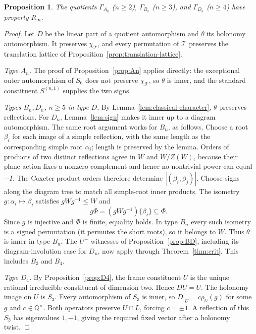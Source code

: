 \documentclass[11pt]{amsart}
\newtheorem{proposition}[theorem]{Proposition}
\theoremstyle{definition}
\newcommand{\Q}{\mathbb{Q}}
\newcommand{\T}{\mathcal{T}}
\newcommand{\Rinf}{R_\infty}
\begin{document}
\begin{proposition}\label{prop:classical-quotients}
The quotients $\Gamma_{A_n}$ ($n\ge2$), $\Gamma_{B_n}$ ($n\ge3$), and $\Gamma_{D_n}$ ($n\ge4$)
have property $\Rinf$.
\end{proposition}
\begin{proof}
Let $D$ be the linear part of a quotient automorphism and $\theta$ its holonomy automorphism.
It preserves $\chi_\T$, and every permutation of $\T$ preserves the translation lattice of Proposition~\ref{prop:translation-lattice}.

\emph{Type $A_n$.} The proof of Proposition~\ref{prop:An} applies directly: the exceptional outer
automorphism of $S_6$ does not preserve $\chi_\T$, so $\theta$ is inner, and the standard constituent
$S^{(n,1)}$ supplies the two signs.

\emph{Types $B_n,D_n$, $n\ge5$ in type $D$.} By Lemma~\ref{lem:classical-character}, $\theta$ preserves
reflections. For $D_n$, Lemma~\ref{lem:sign} makes it inner up to a diagram automorphism.
The same root argument works for $B_n$, as follows. Choose a root $\beta_i$ for each image of a simple
reflection, with the same length as the corresponding simple root $\alpha_i$; length is preserved by the lemma.
Orders of products of two distinct reflections agree in $W$ and $W/Z(W)$, because their plane action
fixes a nonzero complement and hence no nontrivial power can equal $-I$.
The Coxeter product orders therefore determine $|(\beta_i,\beta_j)|$.
Choose signs along the diagram tree to match all simple-root inner products. The isometry $g\colon\alpha_i\mapsto\beta_i$ satisfies $gWg^{-1}\le W$ and
\[g\Phi=(gWg^{-1})\{\beta_i\}\subseteq\Phi.\]
Since $g$ is injective and $\Phi$ is finite, equality holds. In type $B_n$ every such isometry is a signed permutation
(it permutes the short roots), so it belongs to $W$. Thus $\theta$ is inner in type $B_n$.
The $U^-$ witnesses of Proposition~\ref{prop:BD}, including its diagram-involution case for $D_n$,
now apply through Theorem~\ref{thm:crit}. This includes $B_3$ and $B_4$.

\emph{Type $D_4$.} By Proposition~\ref{prop:D4}, the frame constituent $U$ is the unique rational irreducible
constituent of dimension two. Hence $DU=U$.
The holonomy image on $U$ is $S_3$. Every automorphism of $S_3$ is inner, so $D|_U=c\rho_U(g)$ for some
$g$ and $c\in\Q^\times$. Both operators preserve $U\cap L$, forcing $c=\pm1$.
A reflection of this $S_3$ has eigenvalues $1,-1$, giving the required fixed vector after a holonomy twist.
\end{proof}
\end{document}
